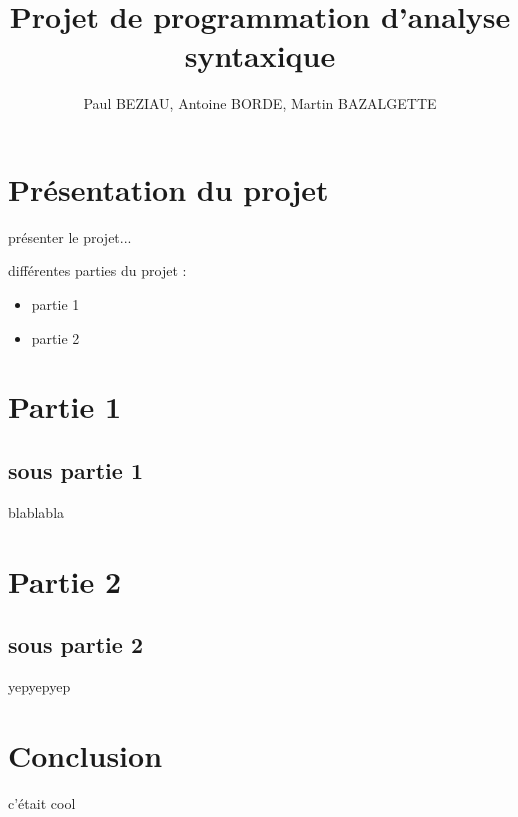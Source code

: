 \documentclass[12pt]{article}
\begin{document}
\title{Projet de programmation d'analyse syntaxique}
\author{Paul BEZIAU, Antoine BORDE, Martin BAZALGETTE}

\maketitle
\newpage
\tableofcontents
\newpage


\section{Présentation du projet}
présenter le projet...
\newline\newline

différentes parties du projet :
\begin{itemize}
\item partie 1
\item partie 2
\end{itemize}

\newpage

\section{Partie 1}
\subsection{sous partie 1}
blablabla

\newpage

\section{Partie 2}
\subsection{sous partie 2}
yepyepyep 

\newpage

\section{Conclusion}
c'était cool
\end{document}
